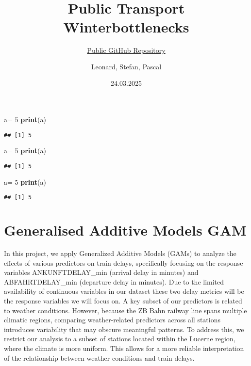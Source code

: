 \documentclass[
]{article}
\title{Public Transport Winterbottlenecks}
\subtitle{\href{https://github.com/paACode/publictransport_winterbottlenecks_palest}{Public
GitHub Repository}}
\author{Leonard, Stefan, Pascal}
\date{24.03.2025}
\newenvironment{Shaded}{\begin{snugshade}}{\end{snugshade}}
\newcommand{\DecValTok}[1]{\textcolor[rgb]{0.00,0.00,0.81}{#1}}
\newcommand{\FunctionTok}[1]{\textcolor[rgb]{0.13,0.29,0.53}{\textbf{#1}}}
\newcommand{\NormalTok}[1]{#1}
\newcommand{\OtherTok}[1]{\textcolor[rgb]{0.56,0.35,0.01}{#1}}
\begin{document}
\maketitle

{
\setcounter{tocdepth}{3}
\tableofcontents
}
\begin{Shaded}
\begin{Highlighting}[]
\NormalTok{a}\OtherTok{=} \DecValTok{5}
\FunctionTok{print}\NormalTok{(a)}
\end{Highlighting}
\end{Shaded}

\begin{verbatim}
## [1] 5
\end{verbatim}

\begin{Shaded}
\begin{Highlighting}[]
\NormalTok{a}\OtherTok{=} \DecValTok{5}
\FunctionTok{print}\NormalTok{(a)}
\end{Highlighting}
\end{Shaded}

\begin{verbatim}
## [1] 5
\end{verbatim}

\begin{Shaded}
\begin{Highlighting}[]
\NormalTok{a}\OtherTok{=} \DecValTok{5}
\FunctionTok{print}\NormalTok{(a)}
\end{Highlighting}
\end{Shaded}

\begin{verbatim}
## [1] 5
\end{verbatim}

\section{Generalised Additive Models
GAM}\label{generalised-additive-models-gam}

In this project, we apply Generalized Additive Models (GAMs) to analyze
the effects of various predictors on train delays, specifically focusing
on the response variables ANKUNFTDELAY\_min (arrival delay in minutes)
and ABFAHRTDELAY\_min (departure delay in minutes). Due to the limited
availability of continuous variables in our dataset these two delay
metrics will be the response variables we will focus on. A key subset of
our predictors is related to weather conditions. However, because the ZB
Bahn railway line spans multiple climatic regions, comparing
weather-related predictors across all stations introduces variability
that may obscure meaningful patterns. To address this, we restrict our
analysis to a subset of stations located within the Lucerne region,
where the climate is more uniform. This allows for a more reliable
interpretation of the relationship between weather conditions and train
delays.
\end{document}
